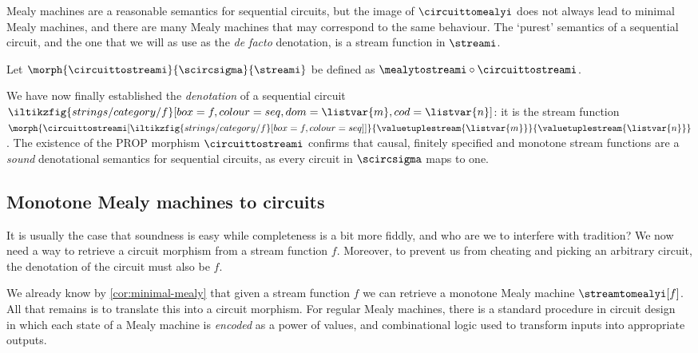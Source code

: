 Mealy machines are a reasonable semantics for sequential circuits, but the
image of \(\circuittomealyi\) does not always lead to minimal Mealy machines,
and there are many Mealy machines that may correspond to the same behaviour.
The `purest' semantics of a sequential circuit, and the one that we will as use
as the \emph{de facto} denotation, is a stream function in \(\streami\).

\begin{definition}
    Let \(\morph{\circuittostreami}{\scircsigma}{\streami}\) be defined as
    \(\mealytostreami \circ \circuittostreami\).
\end{definition}

We have now finally established the \emph{denotation} of a sequential circuit \(
\iltikzfig{strings/category/f}[box=f,colour=seq,dom=\listvar{m},cod=\listvar{n}]
\): it is the stream function \(
\morph{\circuittostreami[\iltikzfig{strings/category/f}[box=f,colour=seq]]}{\valuetuplestream{\listvar{m}}}{\valuetuplestream{\listvar{n}}}
\).
The existence of the PROP morphism \(\circuittostreami\) confirms that causal,
finitely specified and monotone stream functions are a \emph{sound} denotational
semantics for sequential circuits, as every circuit in \(\scircsigma\)
maps to one.

\subsection{Monotone Mealy machines to circuits}

It is usually the case that soundness is easy while completeness is a bit more
fiddly, and who are we to interfere with tradition?
We now need a way to retrieve a circuit morphism from a stream
function \(f\).
Moreover, to prevent us from cheating and picking an arbitrary circuit, the
denotation of the circuit must also be \(f\).

We already know by \cref{cor:minimal-mealy} that given a stream function
\(f\) we can retrieve a monotone Mealy machine \(\streamtomealyi[f]\).
All that remains is to translate this into a circuit morphism.
For regular Mealy machines, there is a standard procedure in circuit
design~\cite{kohavi2009switching} in which each state of a Mealy machine is
\emph{encoded} as a power of values, and combinational logic used to transform
inputs into appropriate outputs.

